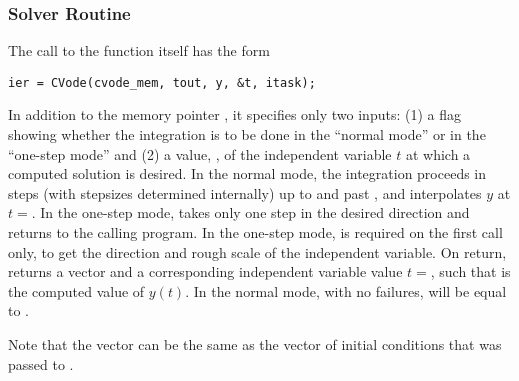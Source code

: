 \subsubsection{{\cvodes} Solver Routine}\label{sss:cvode}

The call to the  function itself has the form
\begin{verbatim}
ier = CVode(cvode_mem, tout, y, &t, itask);
\end{verbatim}
In addition to the {\cvodes} memory pointer , it specifies only two
inputs: (1) a flag  showing whether the integration is to be done in
the ``normal mode'' or in the ``one-step mode'' and (2) a value,
, of the independent variable $t$ at which a computed
solution is desired.  In the normal mode, the integration proceeds in
steps (with stepsizes determined internally) up to and past ,
and  interpolates $y$ at $t = $. In the one-step
mode,  takes only one step in the desired direction and
returns to the calling program.  In the one-step mode,  is
required on the first call only, to get the direction and rough scale
of the independent variable.  On return,  returns a vector
 and a corresponding independent variable value
$t=$, such that  is the computed value of $y(t)$.
In the normal mode, with no failures,  will be equal to
.

Note that the vector  can be the same as the  vector of 
initial conditions that was passed to . 

